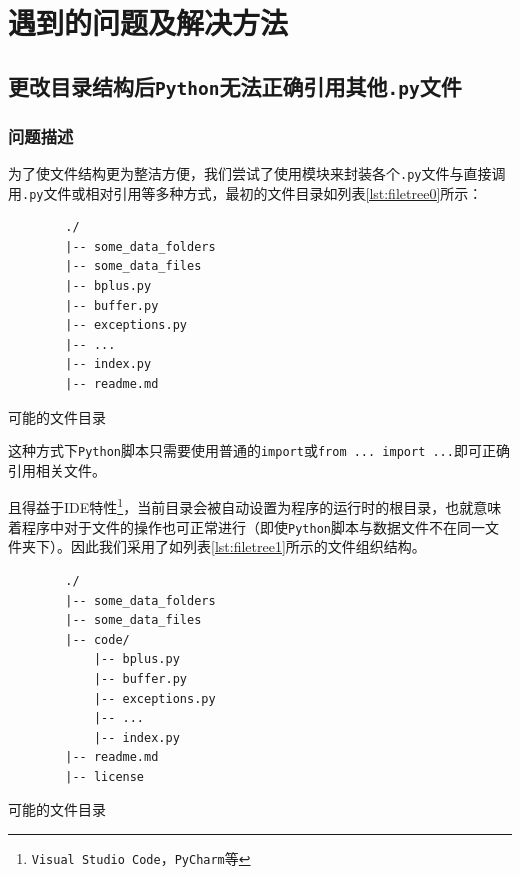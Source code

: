 \documentclass[UTF8]{ctexrep} %
\newenvironment{longlisting}{\captionsetup{type=listing}}{}
\begin{document}
\chapter{遇到的问题及解决方法}
\section{更改目录结构后\texttt{Python}无法正确引用其他\texttt{.py}文件}
\subsection{问题描述}
为了使文件结构更为整洁方便，我们尝试了使用模块来封装各个\texttt{.py}文件与直接调用\texttt{.py}文件或相对引用等多种方式，最初的文件目录如列表\ref{lst:filetree0}所示：
\begin{longlisting}
    \begin{verbatim}
        ./
        |-- some_data_folders
        |-- some_data_files
        |-- bplus.py
        |-- buffer.py
        |-- exceptions.py
        |-- ...
        |-- index.py
        |-- readme.md
    \end{verbatim}
    \caption{可能的文件目录}
    \label{lst:filetree0}
\end{longlisting}
这种方式下\texttt{Python}脚本只需要使用普通的\texttt{import}或\texttt{from ... import ...}即可正确引用相关文件。
\par
且得益于IDE特性\footnote{\texttt{Visual Studio Code}，\texttt{PyCharm}等}，当前目录会被自动设置为程序的运行时的根目录，也就意味着程序中对于文件的操作也可正常进行（即使\texttt{Python}脚本与数据文件不在同一文件夹下）。因此我们采用了如列表\ref{lst:filetree1}所示的文件组织结构。

\begin{longlisting}
    \begin{verbatim}
        ./
        |-- some_data_folders
        |-- some_data_files
        |-- code/
            |-- bplus.py
            |-- buffer.py
            |-- exceptions.py
            |-- ...
            |-- index.py
        |-- readme.md
        |-- license
    \end{verbatim}
    \caption{可能的文件目录}
    \label{lst:filetree1}
\end{longlisting}
\end{document}
